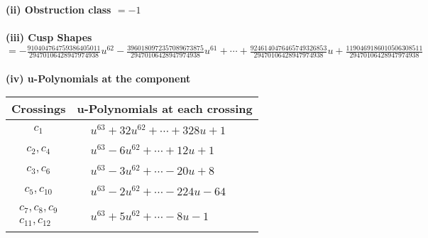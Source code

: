 \documentclass[1p]{elsarticle_modified}
\theoremstyle{definition}
\begin{document}
\flushleft \textbf{(ii) Obstruction class $= -1$}\\~\\
\flushleft \textbf{(iii) Cusp Shapes $= -\frac{910404764759386405011}{29470106428947974938} u^{62}-\frac{3960180972357089673875}{29470106428947974938} u^{61}+\cdots+\frac{9246140476465749326853}{29470106428947974938} u+\frac{1190469186010506308511}{29470106428947974938}$}\\~\\
\newpage\renewcommand{\arraystretch}{1}
\flushleft \textbf{(iv) u-Polynomials at the component}\newline \\
\begin{tabular}{m{50pt}|m{274pt}}
Crossings & \hspace{64pt}u-Polynomials at each crossing \\
\hline $$\begin{aligned}c_{1}\end{aligned}$$&$\begin{aligned}
&u^{63}+32 u^{62}+\cdots+328 u+1
\end{aligned}$\\
\hline $$\begin{aligned}c_{2},c_{4}\end{aligned}$$&$\begin{aligned}
&u^{63}-6 u^{62}+\cdots+12 u+1
\end{aligned}$\\
\hline $$\begin{aligned}c_{3},c_{6}\end{aligned}$$&$\begin{aligned}
&u^{63}-3 u^{62}+\cdots-20 u+8
\end{aligned}$\\
\hline $$\begin{aligned}c_{5},c_{10}\end{aligned}$$&$\begin{aligned}
&u^{63}-2 u^{62}+\cdots-224 u-64
\end{aligned}$\\
\hline $$\begin{aligned}c_{7},c_{8},c_{9}\\c_{11},c_{12}\end{aligned}$$&$\begin{aligned}
&u^{63}+5 u^{62}+\cdots-8 u-1
\end{aligned}$\\
\hline
\end{tabular}\\~\\
\end{document}
